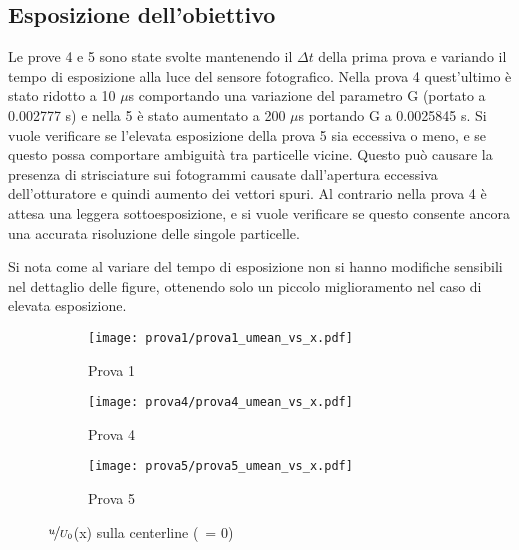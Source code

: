 \documentclass{article} %
\newcommand{\yd}{\nicefrac{\textrm{y}}{\textrm{D}}\ }
\begin{document}
\subsection{Esposizione dell'obiettivo}
Le prove 4 e 5 sono state svolte mantenendo il $\Delta t$ della prima prova e variando il tempo di esposizione alla luce del sensore fotografico. Nella prova 4 quest'ultimo è stato ridotto a 10 $\mu$s  comportando una variazione del parametro G (portato a 0.002777 s) e nella 5 è stato aumentato a 200 $\mu$s portando G a 0.0025845 s. Si vuole verificare se l'elevata esposizione della prova 5 sia eccessiva o meno, e se questo possa comportare ambiguità tra particelle vicine. Questo può causare la presenza di strisciature sui fotogrammi causate dall'apertura eccessiva dell'otturatore e quindi aumento dei vettori spuri. Al contrario nella prova 4 è attesa una leggera sottoesposizione, e si vuole verificare se questo consente ancora una accurata risoluzione delle singole particelle.\par 
Si nota come al variare del tempo di esposizione non si hanno modifiche sensibili nel dettaglio delle figure, ottenendo solo un piccolo miglioramento nel caso di elevata esposizione.
\begin{figure}[b!]
	\centering
	\begin{subfigure}{0.3\textwidth}
		\texttt{[image: prova1/prova1\_umean\_vs\_x.pdf]}
		\label{fig:x_Unorm_1}
		\caption{Prova 1}
	\end{subfigure}
	\begin{subfigure}{0.3\textwidth}
		\texttt{[image: prova4/prova4\_umean\_vs\_x.pdf]}
		\label{fig:x_Unorm_4}
		\caption{Prova 4}
	\end{subfigure}
	\begin{subfigure}{0.3\textwidth}
		\texttt{[image: prova5/prova5\_umean\_vs\_x.pdf]}
		\label{fig:x_Unorm_5}
		\caption{Prova 5}
	\end{subfigure}  
   	\caption{$\nicefrac{u}{U_0}$(x) sulla centerline (\yd = 0)}
	\label{fig:x_Unorm_145}
\end{figure}
\end{document}
